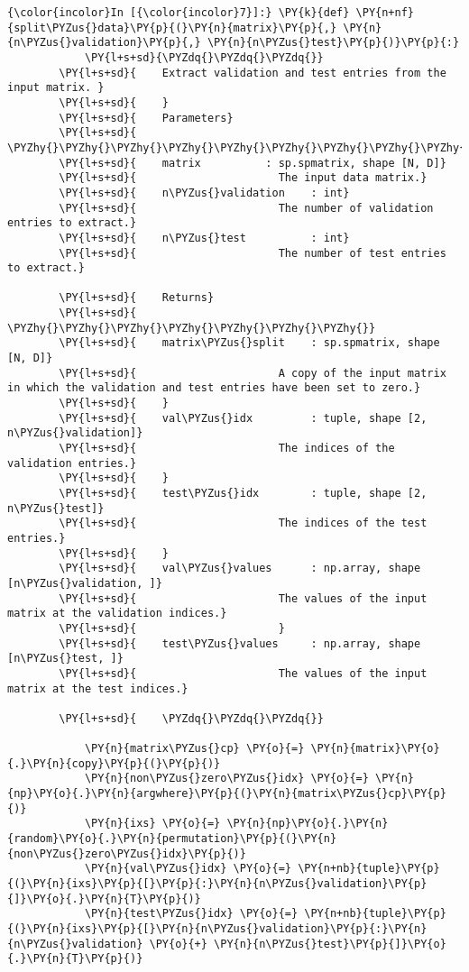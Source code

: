     \begin{Verbatim}[commandchars=\\\{\}]
{\color{incolor}In [{\color{incolor}7}]:} \PY{k}{def} \PY{n+nf}{split\PYZus{}data}\PY{p}{(}\PY{n}{matrix}\PY{p}{,} \PY{n}{n\PYZus{}validation}\PY{p}{,} \PY{n}{n\PYZus{}test}\PY{p}{)}\PY{p}{:}
            \PY{l+s+sd}{\PYZdq{}\PYZdq{}\PYZdq{}}
        \PY{l+s+sd}{    Extract validation and test entries from the input matrix. }
        \PY{l+s+sd}{    }
        \PY{l+s+sd}{    Parameters}
        \PY{l+s+sd}{    \PYZhy{}\PYZhy{}\PYZhy{}\PYZhy{}\PYZhy{}\PYZhy{}\PYZhy{}\PYZhy{}\PYZhy{}\PYZhy{}}
        \PY{l+s+sd}{    matrix          : sp.spmatrix, shape [N, D]}
        \PY{l+s+sd}{                      The input data matrix.}
        \PY{l+s+sd}{    n\PYZus{}validation    : int}
        \PY{l+s+sd}{                      The number of validation entries to extract.}
        \PY{l+s+sd}{    n\PYZus{}test          : int}
        \PY{l+s+sd}{                      The number of test entries to extract.}
        
        \PY{l+s+sd}{    Returns}
        \PY{l+s+sd}{    \PYZhy{}\PYZhy{}\PYZhy{}\PYZhy{}\PYZhy{}\PYZhy{}\PYZhy{}}
        \PY{l+s+sd}{    matrix\PYZus{}split    : sp.spmatrix, shape [N, D]}
        \PY{l+s+sd}{                      A copy of the input matrix in which the validation and test entries have been set to zero.}
        \PY{l+s+sd}{    }
        \PY{l+s+sd}{    val\PYZus{}idx         : tuple, shape [2, n\PYZus{}validation]}
        \PY{l+s+sd}{                      The indices of the validation entries.}
        \PY{l+s+sd}{    }
        \PY{l+s+sd}{    test\PYZus{}idx        : tuple, shape [2, n\PYZus{}test]}
        \PY{l+s+sd}{                      The indices of the test entries.}
        \PY{l+s+sd}{    }
        \PY{l+s+sd}{    val\PYZus{}values      : np.array, shape [n\PYZus{}validation, ]}
        \PY{l+s+sd}{                      The values of the input matrix at the validation indices.}
        \PY{l+s+sd}{                      }
        \PY{l+s+sd}{    test\PYZus{}values     : np.array, shape [n\PYZus{}test, ]}
        \PY{l+s+sd}{                      The values of the input matrix at the test indices.}
        
        \PY{l+s+sd}{    \PYZdq{}\PYZdq{}\PYZdq{}}
            
            \PY{n}{matrix\PYZus{}cp} \PY{o}{=} \PY{n}{matrix}\PY{o}{.}\PY{n}{copy}\PY{p}{(}\PY{p}{)}
            \PY{n}{non\PYZus{}zero\PYZus{}idx} \PY{o}{=} \PY{n}{np}\PY{o}{.}\PY{n}{argwhere}\PY{p}{(}\PY{n}{matrix\PYZus{}cp}\PY{p}{)}
            \PY{n}{ixs} \PY{o}{=} \PY{n}{np}\PY{o}{.}\PY{n}{random}\PY{o}{.}\PY{n}{permutation}\PY{p}{(}\PY{n}{non\PYZus{}zero\PYZus{}idx}\PY{p}{)}
            \PY{n}{val\PYZus{}idx} \PY{o}{=} \PY{n+nb}{tuple}\PY{p}{(}\PY{n}{ixs}\PY{p}{[}\PY{p}{:}\PY{n}{n\PYZus{}validation}\PY{p}{]}\PY{o}{.}\PY{n}{T}\PY{p}{)}
            \PY{n}{test\PYZus{}idx} \PY{o}{=} \PY{n+nb}{tuple}\PY{p}{(}\PY{n}{ixs}\PY{p}{[}\PY{n}{n\PYZus{}validation}\PY{p}{:}\PY{n}{n\PYZus{}validation} \PY{o}{+} \PY{n}{n\PYZus{}test}\PY{p}{]}\PY{o}{.}\PY{n}{T}\PY{p}{)}
            

\end{Verbatim}
